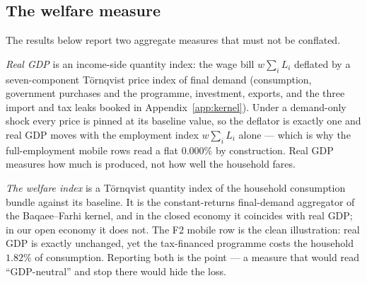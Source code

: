%
\subsection{The welfare measure}\label{subsec:welfare}

The results below report two aggregate measures that must not be conflated.

\emph{Real GDP} is an income-side quantity index: the wage bill
$w\sum_i L_i$ deflated by a seven-component T\"ornqvist price index of final
demand (consumption, government purchases and the programme, investment,
exports, and the three import and tax leaks booked in
Appendix~\ref{app:kernel}). Under a demand-only shock every price is pinned
at its baseline value, so the deflator is exactly one and real GDP moves
with the employment index $w\sum_i L_i$ alone --- which is why the
full-employment mobile rows read a flat $0.000\%$ by construction. Real GDP
measures how much is produced, not how well the household fares.

\emph{The welfare index} is a T\"ornqvist quantity index of the household
consumption bundle against its baseline. It is the constant-returns
final-demand aggregator of the Baqaee--Farhi kernel, and in the closed
economy it coincides with real GDP; in our open economy it does not.
The F2 mobile row is the clean illustration: real GDP is exactly
unchanged, yet the tax-financed programme costs the household
$1.82\%$ of consumption. Reporting both is the point --- a measure that
would read ``GDP-neutral'' and stop there would hide the loss.

